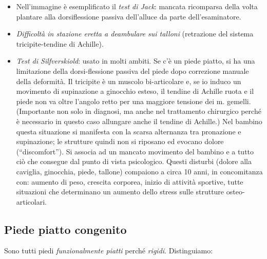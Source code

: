 \begin{itemize}
\item
  Nell'immagine è esemplificato il \emph{test di Jack}: mancata ricomparsa della volta plantare alla dorsiflessione passiva dell'alluce da parte dell'esaminatore.
\item
  \emph{Difficoltà in stazione eretta a deambulare sui talloni} (retrazione del sistema tricipite-tendine di Achille).
\item
  \emph{Test di Silfverskiold}: usato in molti ambiti. Se c'è un piede piatto, si ha una limitazione della dorsi-flessione passiva del piede dopo correzione manuale della deformità. Il tricipite è un muscolo bi-articolare e, se io induco un movimento di supinazione a ginocchio esteso, il tendine di Achille ruota e il piede non va oltre l'angolo retto per una maggiore tensione dei m. gemelli. (Importante non solo in diagnosi, ma anche nel trattamento chirurgico perché è necessario in questo caso allungare anche il tendine di Achille.) Nel bambino questa situazione si manifesta con la scarsa alternanza tra pronazione e supinazione; le strutture quindi non si riposano ed evocano dolore (``discomfort''). Si associa ad un mancato movimento del bambino e a tutto ciò che consegue dal punto di vista psicologico. Questi disturbi (dolore alla caviglia, ginocchia, piede, tallone) compaiono a circa 10 anni, in concomitanza con: aumento di peso, crescita corporea, inizio di attività sportive, tutte situazioni che determinano un aumento dello stress sulle strutture osteo-articolari.
\end{itemize}

\subsection{Piede piatto congenito}

Sono tutti piedi \emph{funzionalmente piatti} perché \emph{rigidi}.
Distinguiamo:

